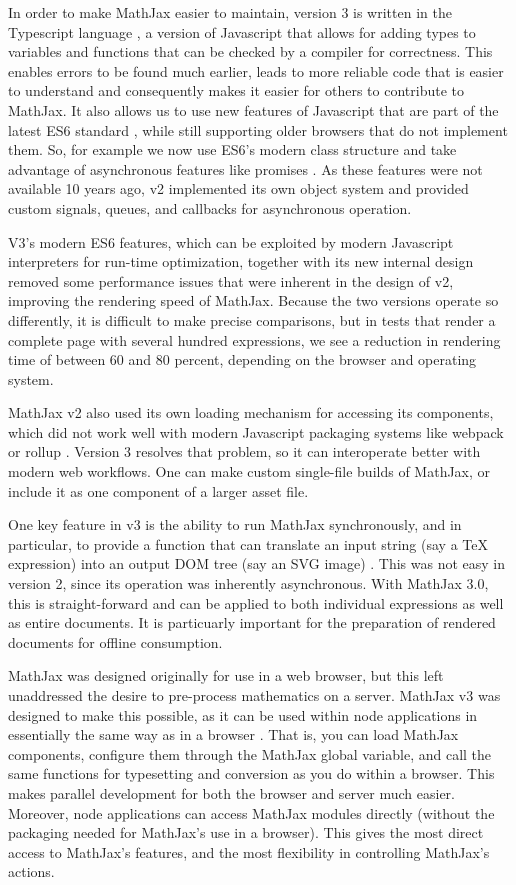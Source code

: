\documentclass[11pt]{article} %
\begin{document}
In order to make MathJax easier to maintain, version 3 is written in the
Typescript language \cite{Typescript}, a version of Javascript that allows for
adding types to variables and functions that can be checked by a compiler for
correctness.  This enables errors to be found much earlier, leads to more
reliable code that is easier to understand and consequently makes it easier for
others to contribute to MathJax.  It also allows us to use new features of
Javascript that are part of the latest ES6 standard \cite{ES6}, while still
supporting older browsers that do not implement them.
So, for example we now use ES6's modern class structure \cite{ES6-class}
and take advantage of asynchronous features like promises \cite{ES6-promise}.
As these features were not available 10 years ago, v2 implemented its
own object system and provided custom signals, queues, and callbacks
for asynchronous operation.

V3's modern ES6 features, which can be exploited by modern Javascript
interpreters for run-time optimization, together with its new internal
design removed some performance issues that were inherent in the
design of v2, improving the rendering speed of MathJax.  Because the
two versions operate so differently, it is difficult to make precise
comparisons, but in tests that render a complete page with several
hundred expressions, we see a reduction in rendering time of between
60 and 80 percent, depending on the browser and operating system.

MathJax v2 also used its own loading mechanism for accessing its
components, which did not work well with modern Javascript packaging
systems like webpack \cite{webpack} or rollup \cite{rollup}.  Version
3 resolves that problem, so it can interoperate better with modern web
workflows. One can make custom single-file builds of MathJax, or
include it as one component of a larger asset file.

One key feature in v3 is the ability to run MathJax synchronously, and
in particular, to provide a function that can translate an input
string (say a TeX expression) into an output DOM tree (say an SVG
image) \cite{MJ-convert}. This was not easy in version 2, since its
operation was inherently asynchronous. With MathJax 3.0, this is
straight-forward and can be applied to both individual expressions as
well as entire documents. It is particuarly important for the
preparation of rendered documents for offline consumption.

MathJax was designed originally for use in a web browser, but this
left unaddressed the desire to pre-process mathematics on a
server. MathJax v3 was designed to make this possible, as it can be
used within node applications in essentially the same way as in a
browser \cite{MJ-web, MJ-node}. That is, you can load MathJax
components, configure them through the MathJax global variable, and
call the same functions for typesetting and conversion as you do
within a browser. This makes parallel development for both the browser
and server much easier.  Moreover, node applications can access
MathJax modules directly (without the packaging needed for MathJax's
use in a browser). This gives the most direct access to MathJax’s
features, and the most flexibility in controlling MathJax’s actions.
\end{document}
